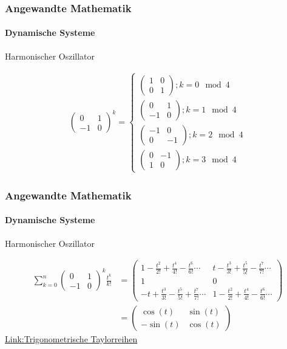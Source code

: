 \documentclass{beamer}
\begin{document}
 \begin{frame}
    \frametitle{Angewandte Mathematik}
\framesubtitle{Dynamische Systeme }
\begin{block}{Harmonischer Oszillator}

\begin{align*}
\begin{pmatrix}
        0 & 1  \\ -1 & 0
    \end{pmatrix}^{k}  = \begin{cases} 
        \begin{pmatrix}
            1 & 0  \\ 0 & 1
        \end{pmatrix}; k = 0 \mod 4 \\
        \begin{pmatrix}
            0 & 1  \\ -1 & 0
        \end{pmatrix}; k = 1 \mod 4 \\
        \begin{pmatrix}
            -1 & 0  \\ 0 & -1
        \end{pmatrix}; k = 2 \mod 4 \\
        \begin{pmatrix}
            0 & -1  \\ 1 & 0
        \end{pmatrix}; k = 3 \mod 4
    \end{cases}
\end{align*}
\end{block}
 \end{frame}

 \begin{frame}
    \frametitle{Angewandte Mathematik}
\framesubtitle{Dynamische Systeme }
\begin{block}{Harmonischer Oszillator}

\begin{align*}
\sum_{k= 0}^{n} \begin{pmatrix}
    0 & 1  \\ -1 & 0
\end{pmatrix}^{k} \frac{t^k}{k!} & =
\begin{pmatrix}
    1-\frac{t^2}{2!} + \frac{t^4}{4!}-\frac{t^6}{6!} \cdots & t -\frac{t^3}{3!} + \frac{t^5}{5!} -\frac{t^7}{7!}\cdots  \\ 1 & 0 \\
    -t +\frac{t^3}{3!} - \frac{t^5}{5!} +\frac{t^7}{7!}   \cdots  & 1-\frac{t^2}{2!} + \frac{t^4}{4!}-\frac{t^6}{6!}  \cdots
\end{pmatrix} \\
&= \begin{pmatrix}
    \cos(t) & \sin(t)  \\ -\sin(t) & \cos(t)
\end{pmatrix}
\end{align*}
\href{https://de.wikipedia.org/wiki/Taylorreihe}{Link:Trigonometrische Taylorreihen}
\end{block}
 \end{frame}
\end{document}
